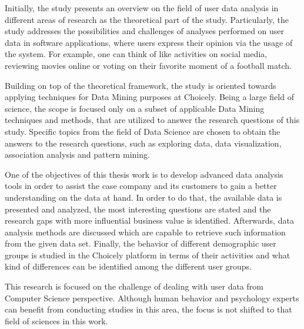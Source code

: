     Initially, the study presents an overview on the field of user data analysis in different areas of research as the theoretical part of the study. Particularly, the study addresses the possibilities and challenges of analyses performed on user data in software applications, where users express their opinion via the usage of the system. For example, one can think of like activities on social media, reviewing movies online or voting on their favorite moment of a football match.

    Building on top of the theoretical framework, the study is oriented towards applying techniques for Data Mining purposes at Choicely. Being a large field of science, the scope is focused only on a subset of applicable Data Mining techniques and methods, that are utilized to answer the research questions of this study. Specific topics from the field of Data Science are chosen to obtain the answers to the research questions, such as exploring data, data visualization, association analysis and pattern mining.

    One of the objectives of this thesis work is to develop advanced data analysis tools in order to assist the case company and its customers to gain a better understanding on the data at hand. In order to do that, the available data is presented and analyzed, the most interesting questions are stated and the research gaps with more influential business value is identified. Afterwards,  data analysis methods are discussed which are capable to retrieve such information from the given data set. Finally, the behavior of different demographic user groups is studied in the Choicely platform in terms of their activities and what kind of differences can be identified among the different user groups.

    This research is focused on the challenge of dealing with user data from Computer Science perspective. Although human behavior and psychology experts can benefit from conducting studies in this area, the focus is not shifted to that field of sciences in this work. 

